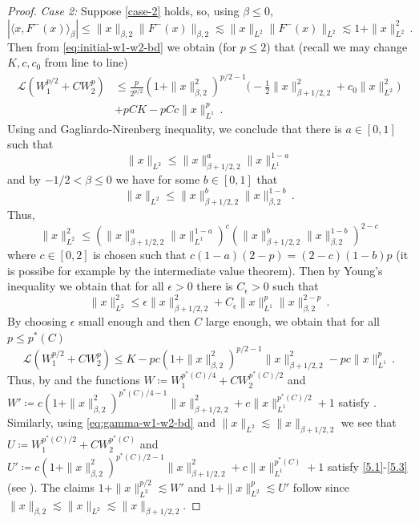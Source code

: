\documentclass[final]{amsart}
\numberwithin{thm}{section}
\numberwithin{equation}{section}
\newcommand{\Ll}{\mathcal{L}}
\newcommand{\ip}[2]{\langle #1, #2 \rangle}
\begin{document}
\begin{proof}
\textit{Case 2:}
Suppose \ref{case-2} holds, so, using $\beta \leq 0$, 
$$
|\ip{x}{F^-(x)}_\beta| \leq \|x\|_{\beta,2}\|F^-(x)\|_{\beta,2} \lesssim \|x\|_{L^2}\|F^-(x)\|_{L^2}\lesssim 1+\|x\|_{L^2}^2 \,.
$$
Then from \eqref{eq:initial-w1-w2-bd} we obtain (for $p \leq 2$)
that (recall we may change $K,c,c_0$ from line to line)
\begin{equation*}
    \begin{aligned}
    \Ll (W_1^{p/2} + CW_2^p) &\leq \frac{p}{2^{p/2}}(1+\|x\|_{\beta,2}^2)^{p/2-1}\Big(-\frac{1}{2}\|x\|_{\beta+1/2,2}^2 + c_0\|x\|_{L^2}^2\Big) \\
    &+ pCK - pCc\|x\|_{L^1}^p \,.
    \end{aligned}
\end{equation*}
Using  and Gagliardo-Nirenberg inequality,  we conclude that there is $a \in [0,1]$ such that
$$\|x\|_{L^2} \leq \|x\|_{\beta+1/2,2}^a\|x\|_{L^1}^{1-a}$$
and by $-1/2 < \beta \leq 0$ we have for some $b \in [0,1]$ that
$$\|x\|_{L^2} \leq \|x\|_{\beta+1/2,2}^b\|x\|_{\beta,2}^{1-b} \,.$$
Thus, 
$$\|x\|_{L^2}^2 \leq (\|x\|_{\beta+1/2,2}^a\|x\|_{L^1}^{1-a})^c(\|x\|_{\beta+1/2,2}^b\|x\|_{\beta,2}^{1-b})^{2-c}$$
where 
$c \in [0,2]$ is chosen such that $c(1-a)(2-p) = (2-c)(1-b)p$ (it is possibe for example by the intermediate value theorem). Then by Young's inequality we obtain that for all $\epsilon > 0$ there is $C_\epsilon > 0$ such that
$$\|x\|_{L^2}^2 \leq \epsilon\|x\|_{\beta+1/2,2}^2 + C_\epsilon\|x\|_{L^1}^p\|x\|_{\beta,2}^{2-p} \,.$$
By choosing $\epsilon$ small enough and then $C$ large enough, we obtain that for all $p \leq p^*(C)$
\begin{equation*}
    \Ll (W_1^{p/2} + CW_2^p) \leq K -pc(1+\|x\|_{\beta,2}^2)^{p/2-1}\|x\|_{\beta+1/2,2}^2 - pc\|x\|_{L^1}^p \,.
\end{equation*}
Thus, by  and  the functions $W \coloneqq W_1^{p^*(C)/4} + CW_2^{p^*(C)/2}$ and $W' \coloneqq c(1+\|x\|_{\beta,2}^2)^{p^*(C)/4-1}\|x\|_{\beta+1/2,2}^2 + c\|x\|_{L^1}^{p^*(C)/2} + 1$ satisfy . Similarly, using \eqref{eq:gamma-w1-w2-bd} and $\|x\|_{L^2} \lesssim \|x\|_{\beta+1/2,2}$ we see that $U \coloneqq W_1^{p^*(C)/2} + CW_2^{p^*(C)}$ and $U' \coloneqq c(1+\|x\|_{\beta,2}^2)^{p^*(C)/2-1}\|x\|_{\beta+1/2,2}^2 + c\|x\|_{L^1}^{p^*(C)} + 1$ satisfy \ref{5.1}-\ref{5.3} (see ). The claims $1+\|x\|_{L^2}^{p/2} \lesssim W'$ and $1+\|x\|_{L^2}^p \lesssim U'$ follow since $\|x\|_{\beta,2} \lesssim \|x\|_{L^2} \lesssim \|x\|_{\beta+1/2,2}$.
\end{proof}
\end{document}
